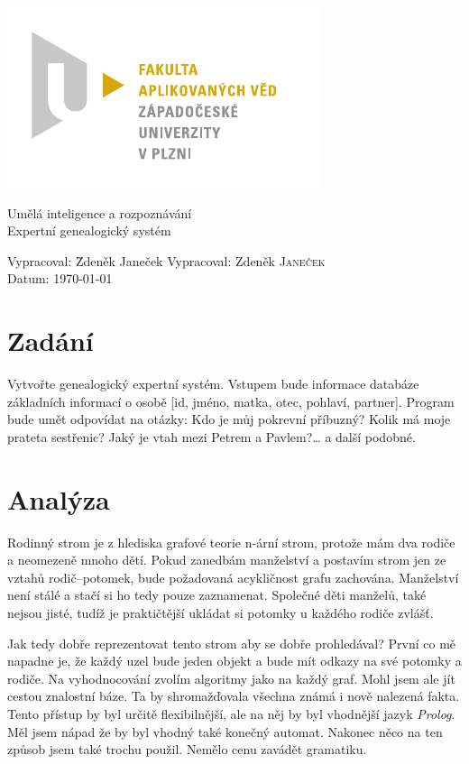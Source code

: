 \documentclass[a4paper, 12pt]{article}
\begin{document}
\begin{titlepage}
\includegraphics{fav_cmyk.pdf}
\vfill
\begin{center}
{\huge Umělá inteligence a rozpoznávání}\\[3ex]
{\Large Expertní genealogický systém}
\end{center}
\vfill
\begin{tabbing}
Vypracoval: \hspace{1ex}\=Zdeněk Janeček\kill
Vypracoval: \>Zdeněk \textsc{Janeček}\\[1ex]
Datum:\> \today
\end{tabbing}
\end{titlepage}

\section{Zadání}
Vytvořte genealogický expertní systém. Vstupem bude informace databáze
základních informací o osobě [id, jméno, matka, otec, pohlaví, partner].
Program bude umět odpovídat na otázky: Kdo je můj pokrevní příbuzný?
Kolik má moje prateta sestřenic? Jaký je vtah mezi Petrem a Pavlem?\ldots
a další podobné.

\section{Analýza}
Rodinný strom je z hlediska grafové teorie n-ární strom, protože mám dva
rodiče a neomezeně mnoho dětí. Pokud zanedbám manželství a postavím
strom jen ze vztahů rodič--potomek, bude požadovaná acykličnost grafu
zachována.
Manželství není stálé a stačí si ho tedy pouze zaznamenat.
Společné děti manželů, také nejsou jisté, tudíž je praktičtější ukládat
si potomky u každého rodiče zvlášť.

Jak tedy dobře reprezentovat tento strom aby se dobře prohledával?
První co mě napadne je, že každý uzel bude jeden objekt a bude mít
odkazy na své potomky a rodiče. Na vyhodnocování zvolím algoritmy
jako na každý graf. Mohl jsem ale jít cestou znalostní báze. Ta by
shromažďovala všechna známá i nově nalezená fakta. Tento přístup
by byl určitě flexibilnější, ale na něj by byl vhodnější jazyk \emph{Prolog}.
Měl jsem nápad že by byl vhodný také konečný automat. Nakonec něco
na ten způsob jsem také trochu použil. Nemělo cenu zavádět gramatiku.
\end{document}

